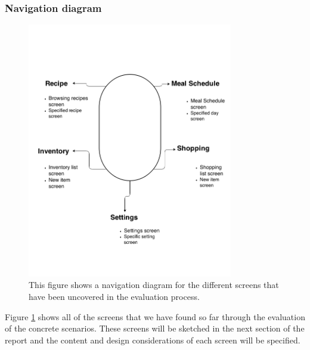 \subsubsection{Navigation diagram}


\begin{figure}[H]
	\includegraphics[width=0.8\textwidth]{Grafik/FoodPlanner/NavigationsDiagram}
	\caption{This figure shows a navigation diagram for the different screens that have been uncovered in the evaluation process.}
	\label{NavigationDiagram}
\end{figure}

Figure \cref{NavigationDiagram} shows all of the screens that we have found so far through the evaluation of the concrete scenarios. These screens will be sketched in the next section of the report and the content and design considerations of each screen will be specified.  
